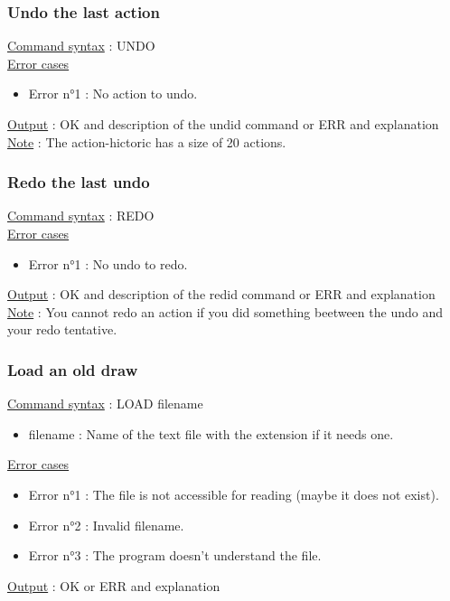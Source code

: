 \documentclass[a4paper, 12pts]{article}
\begin{document}
		\subsubsection{Undo the last action}
			\uline{Command syntax} :
			UNDO\\
			\uline{Error cases}
			\begin{itemize}
				\item Error n°1 : No action to undo.
			\end{itemize}
			\uline{Output} : OK and description of the undid command or ERR and explanation\\
			\uline{Note} : 
			The action-hictoric has a size of 20 actions.

		\subsubsection{Redo the last undo}
			\uline{Command syntax} :
			REDO\\
			\uline{Error cases}
			\begin{itemize}
				\item Error n°1 : No undo to redo.
			\end{itemize}
			\uline{Output} : OK and description of the redid command or ERR and explanation\\
			\uline{Note} : 
			You cannot redo an action if you did something beetween the undo and your redo tentative.

		\subsubsection{Load an old draw}
			\uline{Command syntax} :
			LOAD filename
			\begin{itemize}
				\item filename : Name of the text file with the extension if it needs one.
			\end{itemize}
			\uline{Error cases}
			\begin{itemize}
				\item Error n°1 : The file is not accessible for reading (maybe it does not exist).
				\item Error n°2 : Invalid filename.
				\item Error n°3 : The program doesn't understand the file.
			\end{itemize}
			\uline{Output} : OK or ERR and explanation\\
\end{document}

